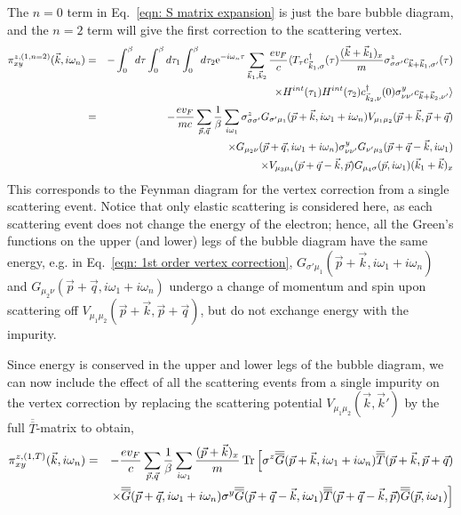 \documentclass[letter,12pt,preprint,aps]{revtex4-1}
\newcommand{\ba}{\begin{eqnarray}}
\newcommand{\ea}{\end{eqnarray}}
\newcommand{\dg}{^{\dagger}}
\newcommand{\me}{\mathrm{e}}
\newcommand{\Gbar}{\overline{\overline{G}}}
\newcommand{\Tbar}{\overline{\overline{T}}}
\begin{document}
The $n = 0$ term in Eq.~\ref{eqn: S matrix expansion} is just the bare bubble diagram, and the $n = 2$ term will give the first correction to the scattering vertex.
%
\ba
\label{eqn: 1st order vertex correction}
\pi^{z, (1, n=2)}_{xy} (\vec{k}, i \omega_n) & = & - \int_{0}^{\beta} d \tau \int_{0}^{\beta} d \tau_1 \int_{0}^{\beta} d \tau_2 \me^{- i \omega_n \tau} \sum_{\vec{k}_1, \vec{k}_2} \frac{e v_F}{c} \langle T_{\tau} c\dg_{\vec{k}_1, \sigma}(\tau) \frac{(\vec{k} + \vec{k}_{1})_x}{m} \sigma^z_{\sigma \sigma'}  c_{\vec{k} + \vec{k}_1, \sigma'}(\tau) \cr
 & & \times H^{int}(\tau_1) H^{int}(\tau_2) c\dg_{\vec{k}_2, \nu}(0) \sigma^{y}_{\nu \nu'} c_{\vec{k} + \vec{k}_2, \nu'} \rangle \cr
& = & -\frac{e v_F}{m c} \sum_{\vec{p}, \vec{q}} \frac{1}{\beta} \sum_{i \omega_1} \sigma^z_{\sigma \sigma'} G_{\sigma' \mu_1}(\vec{p} + \vec{k}, i \omega_1 + i \omega_n) V_{\mu_1 \mu_2}(\vec{p} + \vec{k}, \vec{p} + \vec{q}) \cr
 & & \times G_{\mu_2 \nu}(\vec{p} + \vec{q}, i \omega_1 + i \omega_n) \sigma^{y}_{\nu \nu'} G_{\nu' \mu_3}(\vec{p} + \vec{q} - \vec{k}, i \omega_1) \cr
 & & \times V_{\mu_3 \mu_4}(\vec{p} + \vec{q} - \vec{k}, \vec{p}) G_{\mu_4 \sigma}(\vec{p}, i \omega_1) (\vec{k}_1 + \vec{k})_x
\ea
%
This corresponds to the Feynman diagram for the vertex correction from a single scattering event. Notice that only elastic scattering is considered here, as each scattering event does not change the energy of the electron; hence, all the Green's functions on the upper (and lower) legs of the bubble diagram have the same energy, e.g. in Eq.~\ref{eqn: 1st order vertex correction}, $G_{\sigma' \mu_1}(\vec{p} + \vec{k}, i \omega_1 + i \omega_n)$ and $G_{\mu_2 \nu}(\vec{p} + \vec{q}, i \omega_1 + i \omega_n)$ undergo a change of momentum and spin upon scattering off $V_{\mu_1 \mu_2}(\vec{p} + \vec{k}, \vec{p} + \vec{q})$, but do not exchange energy with the impurity.

Since energy is conserved in the upper and lower legs of the bubble diagram, we can now include the effect of all the scattering events from a single impurity on the vertex correction by replacing the scattering potential $V_{\mu_1 \mu_2}(\vec{k}, \vec{k}')$ by the full $\Tbar$-matrix to obtain,
%
\ba
\label{eqn: scattering vertex with T matrix}
\pi^{z, (1, T)}_{xy} (\vec{k}, i \omega_n) & = & -\frac{e v_F}{c} \sum_{\vec{p}, \vec{q}} \frac{1}{\beta} \sum_{i \omega_1}  \frac{(\vec{p} + \vec{k})_x}{m}
\Tr \Big[ \sigma^z \Gbar(\vec{p} + \vec{k}, i \omega_1 + i \omega_n) \Tbar(\vec{p} + \vec{k}, \vec{p} + \vec{q}) \cr
 & & \times \Gbar(\vec{p} + \vec{q}, i \omega_1 + i \omega_n) \sigma^{y} \Gbar(\vec{p} + \vec{q} - \vec{k}, i \omega_1) \Tbar(\vec{p} + \vec{q} - \vec{k}, \vec{p}) \Gbar(\vec{p}, i \omega_1) \Big] 
 \ea
\end{document}
